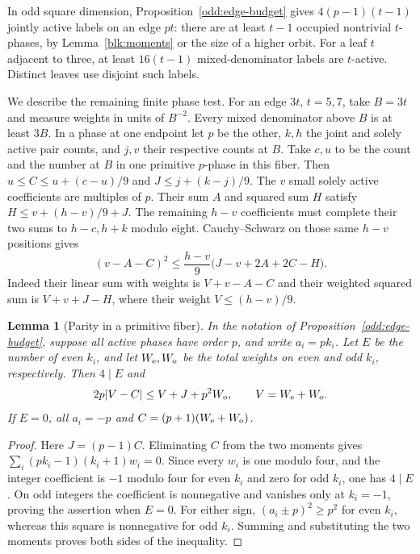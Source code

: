 \documentclass[11pt]{amsart}
\numberwithin{equation}{section}
\newtheorem{lemma}[theorem]{Lemma}
\theoremstyle{definition}
\theoremstyle{plain}
\begin{document}
In odd square dimension, Proposition~\ref{odd:edge-budget} gives $4(p-1)(t-1)$ jointly active labels on an edge $pt$:
there are at least $t-1$ occupied nontrivial $t$-phases, by
Lemma~\ref{blk:moments} or the size of a higher orbit. For a leaf
$t$ adjacent to three, at least $16(t-1)$ mixed-denominator labels
are $t$-active. Distinct leaves use disjoint such labels.

We describe the remaining finite phase test. For an edge $3t$,
$t=5,7$, take $B=3t$ and measure weights in units of $B^{-2}$.
Every mixed denominator above $B$ is at least $3B$. In a phase at
one endpoint let $p$ be the other, $k,h$ the joint and solely active
pair counts, and $j,v$ their respective counts at $B$. Take $c,u$ to
be the count and the number at $B$ in one primitive $p$-phase in this
fiber. Then $u\le C\le u+(c-u)/9$ and $J\le j+(k-j)/9$. The $v$
small solely active coefficients are multiples of $p$. Their sum $A$
and squared sum $H$ satisfy $H\le v+(h-v)/9+J$. The remaining $h-v$
coefficients must complete their two sums to $h-c,h+k$ modulo eight.
Cauchy--Schwarz on those same $h-v$ positions gives
\[
 (v-A-C)^2\le\frac{h-v}{9}\bigl(J-v+2A+2C-H\bigr).
\]
Indeed their linear sum with weights is $V+v-A-C$ and their weighted
squared sum is $V+v+J-H$, where their weight $V\le(h-v)/9$.
\begin{lemma}[Parity in a primitive fiber]\label{odd:parity-lattice}
In the notation of Proposition~\ref{odd:edge-budget}, suppose all active
phases have order $p$, and write $a_i=pk_i$. Let $E$ be the number
of even $k_i$, and let $W_{\rm e},W_{\rm o}$ be the total weights
on even and odd $k_i$, respectively. Then $4\mid E$ and
\[
 2p|V-C|\le V+J+p^2W_{\rm o},\qquad V=W_{\rm e}+W_{\rm o}.
\]
If $E=0$, all $a_i=-p$ and $C=(p+1)(W_{\rm e}+W_{\rm o})$.
\end{lemma}
\begin{proof}
Here $J=(p-1)C$. Eliminating $C$ from the two moments gives
$\sum_i(pk_i-1)(k_i+1)w_i=0$. Since every $w_i$ is one modulo
four, and the integer coefficient is $-1$ modulo four for even
$k_i$ and zero for odd $k_i$, one has $4\mid E$.
On odd integers the coefficient is nonnegative and vanishes only
at $k_i=-1$, proving the assertion when $E=0$.
For either sign, $(a_i\pm p)^2\ge p^2$ for even $k_i$,
whereas this square is nonnegative for odd $k_i$. Summing and
substituting the two moments proves both sides of the inequality.
\end{proof}
\end{document}

